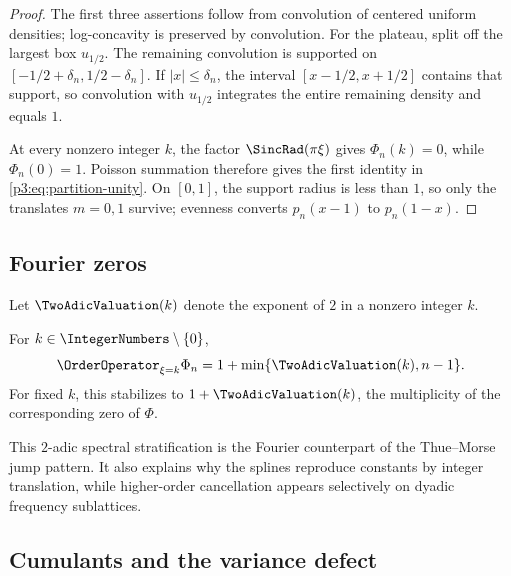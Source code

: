 \documentclass[11pt,oneside]{article}
\numberwithin{equation}{section}
\theoremstyle{definition}
\theoremstyle{remark}
\begin{document}
\begin{proof}
The first three assertions follow from convolution of centered uniform densities;
log-concavity is preserved by convolution.  For the plateau, split off the largest box
$u_{1/2}$.  The remaining convolution is supported on
$[-1/2+\delta_n,1/2-\delta_n]$.  If $|x|\le\delta_n$, the interval
$[x-1/2,x+1/2]$ contains that support, so convolution with $u_{1/2}$ integrates the
entire remaining density and equals $1$.

At every nonzero integer $k$, the factor $\SincRad(\pi\xi)$ gives $\Phi_n(k)=0$, while
$\Phi_n(0)=1$.  Poisson summation therefore gives the first identity in
\cref{p3:eq:partition-unity}.  On $[0,1]$, the support radius is less than $1$, so only the
translates $m=0,1$ survive; evenness converts $p_n(x-1)$ to $p_n(1-x)$.
\end{proof}

\subsection{Fourier zeros}

Let $\TwoAdicValuation(k)$ denote the exponent of $2$ in a nonzero integer $k$.

\begin{proposition}
\label{p3:prop:zero-multiplicity}
For $k\in\IntegerNumbers\setminus\{0\}$,
\begin{equation}
 \OrderOperator_{\xi=k}\Phi_n
 =1+\min\{\TwoAdicValuation(k),n-1\}.
 \label{p3:eq:zero-multiplicity}
\end{equation}
For fixed $k$, this stabilizes to $1+\TwoAdicValuation(k)$, the multiplicity of the corresponding
zero of $\Phi$.
\end{proposition}

This $2$-adic spectral stratification is the Fourier counterpart of the Thue--Morse
jump pattern.  It also explains why the splines reproduce constants by integer
translation, while higher-order cancellation appears selectively on dyadic frequency
sublattices.

\subsection{Cumulants and the variance defect}
\end{document}
